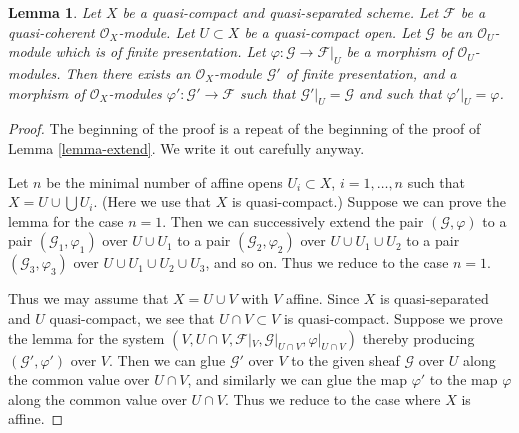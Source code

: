 \documentclass{stacks-project}
\theoremstyle{plain}
\newtheorem{lemma}[subsection]{Lemma}
\theoremstyle{definition}
\theoremstyle{remark}
\numberwithin{equation}{subsection}
\begin{document}
\begin{lemma}
\label{lemma-extend-finite-presentation}
Let $X$ be a quasi-compact and quasi-separated scheme.
Let $\mathcal{F}$ be a quasi-coherent $\mathcal{O}_X$-module.
Let $U \subset X$ be a quasi-compact open.
Let $\mathcal{G}$ be an $\mathcal{O}_U$-module which is of finite presentation.
Let $\varphi : \mathcal{G} \to \mathcal{F}|_U$ be a morphism of
$\mathcal{O}_U$-modules.
Then there exists an $\mathcal{O}_X$-module
$\mathcal{G}'$ of finite presentation, and a morphism
of $\mathcal{O}_X$-modules $\varphi' : \mathcal{G}' \to \mathcal{F}$
such that $\mathcal{G}'|_U = \mathcal{G}$ and such that
$\varphi'|_U = \varphi$.
\end{lemma}

\begin{proof}
The beginning of the proof is a repeat of the beginning of the
proof of Lemma \ref{lemma-extend}. We write it out carefully anyway.

\medskip\noindent
Let $n$ be the minimal number of affine opens $U_i \subset X$,
$i = 1, \ldots , n$ such that $X = U \cup \bigcup U_i$.
(Here we use that $X$ is quasi-compact.) Suppose
we can prove the lemma for the case $n = 1$. Then we can successively
extend the pair $(\mathcal{G}, \varphi)$
to a pair $(\mathcal{G}_1, \varphi_1)$ over $U \cup U_1$
to a pair $(\mathcal{G}_2, \varphi_2)$ over $U \cup U_1 \cup U_2$
to a pair $(\mathcal{G}_3, \varphi_3)$ over $U \cup U_1 \cup U_2 \cup U_3$,
and so on.
Thus we reduce to the case $n = 1$.

\medskip\noindent
Thus we may assume that $X = U \cup V$ with $V$ affine.
Since $X$ is quasi-separated and $U$ quasi-compact,
we see that $U \cap V \subset V$ is quasi-compact.
Suppose we prove the lemma for the system
$(V, U \cap V, \mathcal{F}|_V, \mathcal{G}|_{U \cap V}, \varphi|_{U \cap V})$
thereby producing $(\mathcal{G}', \varphi')$ over $V$.
Then we can glue $\mathcal{G}'$ over $V$ to the given sheaf $\mathcal{G}$
over $U$ along the common value over $U \cap V$, and similarly we can glue
the map $\varphi'$ to the map $\varphi$ along the common value over
$U \cap V$. Thus we reduce to the case where $X$ is affine.


\end{proof}
\end{document}
